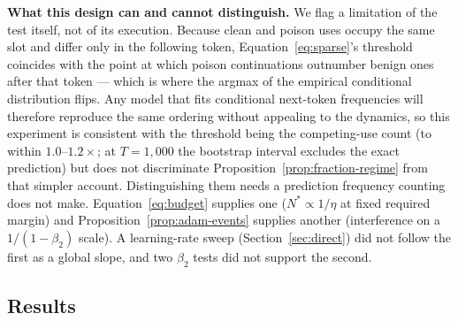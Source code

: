 \documentclass{article} %
\begin{document}
\textbf{What this design can and cannot distinguish.} We flag a limitation of the test
itself, not of its execution. Because clean and poison uses occupy the same slot and
differ only in the following token, Equation~\ref{eq:sparse}'s threshold coincides with
the point at which poison continuations outnumber benign ones after that token --- which
is where the argmax of the empirical conditional distribution flips. Any model that
fits conditional next-token frequencies will therefore reproduce the same ordering
without appealing to the dynamics, so this experiment is consistent with the threshold being the competing-use count (to within $1.0$--$1.2\times$; at $T=1{,}000$ the bootstrap interval excludes the exact prediction) but does not discriminate
Proposition~\ref{prop:fraction-regime} from that simpler account. Distinguishing them
needs a prediction frequency counting does not make. Equation~\ref{eq:budget} supplies
one ($N^*\propto1/\eta$ at fixed required margin) and Proposition~\ref{prop:adam-events}
supplies another (interference on a $1/(1-\beta_2)$ scale). A learning-rate sweep (Section~\ref{sec:direct}) did not follow the first as a global slope, and two $\beta_2$ tests did not support the second.

\subsection{Results}
\end{document}
